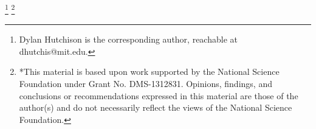 \documentclass[conference]{IEEEtran}
\begin{document}
\maketitle

{\let\thefootnote\relax\footnote{\hspace{-\parindent}Dylan Hutchison is the corresponding
    author, reachable at dhutchis@mit.edu.
}}
{\let\thefootnote\relax\footnote{*This material is based upon work
    supported by the National Science Foundation under Grant
    No. DMS-1312831. Opinions, findings, and conclusions or recommendations expressed in this material are those of the author(s) and do not necessarily reflect the views of the National Science Foundation.
}}
\setcounter{footnote}{0}


\IEEEpeerreviewmaketitle

\end{document}
